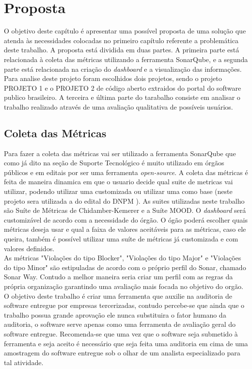 \chapter[Proposta]{Proposta}
O objetivo deste capítulo é apresentar uma possível proposta de uma solução que atenda às necessidades colocadas no primeiro capítulo referente a problemática deste trabalho. A proposta está dividida em duas partes. A primeira parte está relacionada à coleta das métricas utilizando a ferramenta SonarQube, e a segunda parte está relacionada na criação do \textit{dashboard} e a visualização das informações. Para analise deste projeto foram escolhidos dois projetos, sendo o projeto PROJETO 1 e o PROJETO 2 de código aberto extraidos do portal do software publico brasileiro. A terceira e última parte do tarabalho consiste em analisar o trabalho realizado através de uma avaliação qualitativa de possíveis usuários.
\section{Coleta das Métricas}
Para fazer a coleta das métricas vai ser utilizado a ferramenta SonarQube que como já dito na seção de Suporte Tecnológico é muito utilizado em órgãos públicos e em editais por ser uma ferramenta \textit{open-source}. A coleta das métricas é feita de maneira dinamica em que o usuario decide qual suite de metricas vai utilizar, podendo utilizar uma customizada ou utilizar uma como base (neste projeto sera utilizada a do edital do DNPM \cite{edital}). As suites utilizadas neste trabalho são Suíte de Métricas de Chidamber-Kemerer e a Suíte MOOD.
O \textit{dashboard} será customizável de acordo com a necessidade do órgão. O ógão poderá escolher quais métricas deseja usar e qual a faixa de valores aceitáveis para as métricas, caso ele queira, também é possível utilizar uma suíte de métricas já customizada e com valores definidos. 
\\As métricas "Violações do tipo Blocker", "Violações do tipo Major" e "Violações do tipo Minor" são estipuladas de acordo com o próprio perfil do Sonar, chamado Sonar Way. Contudo a melhor maneira seria criar um perfil com as regras da própria organização garantindo uma avaliação mais focada no objetivo do orgão.
\\O objetivo deste trabalho é criar uma ferramenta que auxilie na auditoria de software entregue por empresas tercerizadas, contudo percebe-se que ainda que o trabalho possua grande aprovação ele nunca substituira o fator humano da auditoria, o software serve apenas como uma ferramenta de avaliação geral do software entregue. Recomenda-se que uma vez que o software seja submetido à ferramenta e seja aceito é necessário que seja feita uma auditoria em cima de uma amostragem do software entregue sob o olhar de um analista especializado para tal atividade.
